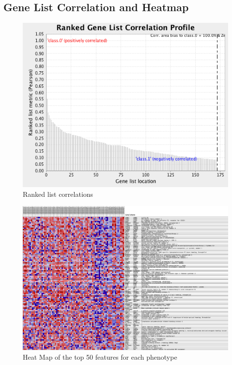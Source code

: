 \subsection{Gene List Correlation and Heatmap}

\begin{figure}[h]
    \centering
    \includegraphics[scale=0.75]{../figs/ranked_list_corr_193.png}
    \caption{Ranked list correlations}
    \label{fig:gene-cor-1}
\end{figure}

\begin{figure}[h]
    \centering
    \includegraphics[width=\paperwidth]{../figs/heat_map_192.png}
    \caption{Heat Map of the top 50 features for each phenotype}
    \label{fig:heatmap-1}
\end{figure}
